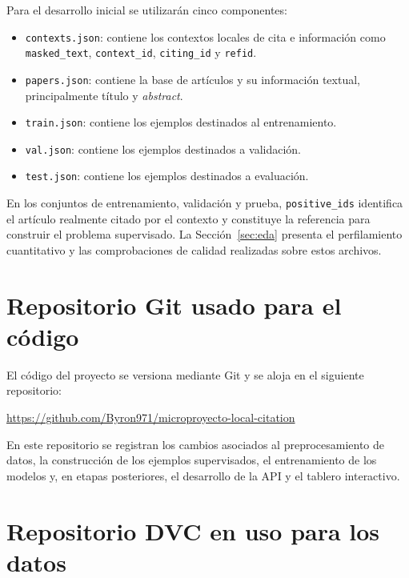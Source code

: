 \documentclass[11pt]{article}
\begin{document}
Para el desarrollo inicial se utilizarán cinco componentes:

\begin{itemize}[leftmargin=1.4em, itemsep=3pt]
  \item \texttt{contexts.json}: contiene los contextos locales de cita e información como \texttt{masked\_text}, \texttt{context\_id}, \texttt{citing\_id} y \texttt{refid}.
  \item \texttt{papers.json}: contiene la base de artículos y su información textual, principalmente título y \textit{abstract}.
  \item \texttt{train.json}: contiene los ejemplos destinados al entrenamiento.
  \item \texttt{val.json}: contiene los ejemplos destinados a validación.
  \item \texttt{test.json}: contiene los ejemplos destinados a evaluación.
\end{itemize}

En los conjuntos de entrenamiento, validación y prueba, \texttt{positive\_ids} identifica el artículo realmente citado por el contexto y constituye la referencia para construir el problema supervisado. La Sección~\ref{sec:eda} presenta el perfilamiento cuantitativo y las comprobaciones de calidad realizadas sobre estos archivos.

\section{Repositorio Git usado para el código}

El código del proyecto se versiona mediante Git y se aloja en el siguiente repositorio:

\begin{center}
\url{https://github.com/Byron971/microproyecto-local-citation}
\end{center}

En este repositorio se registran los cambios asociados al preprocesamiento de datos, la construcción de los ejemplos supervisados, el entrenamiento de los modelos y, en etapas posteriores, el desarrollo de la API y el tablero interactivo.

\section{Repositorio DVC en uso para los datos}
\end{document}
